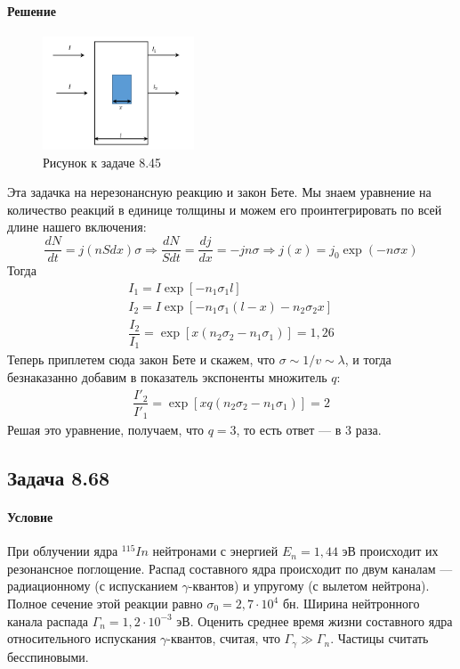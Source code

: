 \documentclass[12pt]{article}
\begin{document}
\paragraph{Решение}
\begin{figure}[h]
    \centering
    \includegraphics[width=0.4\textwidth,height=\textheight,keepaspectratio]{Seminar_10/pics/pic_03_8_45.pdf}
    \caption{Рисунок к задаче 8.45}
\end{figure}
Эта задачка на нерезонансную реакцию и закон Бете. Мы знаем уравнение на количество реакций в единице толщины и можем его проинтегрировать по всей длине нашего включения:
\begin{equation*}
    \dfrac{dN}{dt} = j (nSdx) \sigma \Rightarrow \dfrac{dN}{Sdt} = \dfrac{dj}{dx}= - j n \sigma \Rightarrow j(x) = j_0 \exp{(-n\sigma x)}
\end{equation*}
Тогда 
\begin{gather*}
    I_1 = I \exp{[-n_1\sigma_1 l]}\\
    I_2 = I \exp{[-n_1\sigma_1 (l-x)-n_2\sigma_2 x]}\\
    \dfrac{I_2}{I_1} = \exp{[x(n_2\sigma_2 - n_1\sigma_1)]} = 1,26
\end{gather*}
Теперь приплетем сюда закон Бете и скажем, что $\sigma \sim 1/v \sim \lambda$, и тогда безнаказанно добавим в показатель экспоненты множитель $q$:
\begin{gather*}
    \dfrac{I'_2}{I'_1} = \exp{[xq(n_2\sigma_2 - n_1\sigma_1)]} = 2
\end{gather*}
Решая это уравнение, получаем, что $q = 3$, то есть ответ --- в 3 раза.

\subsection{Задача 8.68}
\paragraph{Условие}
При облучении ядра $^{115}In$ нейтронами с энергией $E_n = 1,44$ эВ происходит их резонансное поглощение. Распад составного ядра происходит по двум каналам --- радиационному (с испусканием $\gamma$-квантов) и упругому (с вылетом нейтрона). Полное сечение этой реакции равно $\sigma_0 = 2,7 \cdot 10^4$ бн. Ширина нейтронного канала распада $\Gamma_n = 1,2 \cdot 10^{-3}$ эВ. Оценить среднее время жизни составного ядра относительного испускания $\gamma$-квантов,
считая, что $\Gamma_{\gamma} \gg \Gamma_n$. Частицы считать бесспиновыми.
\end{document}
